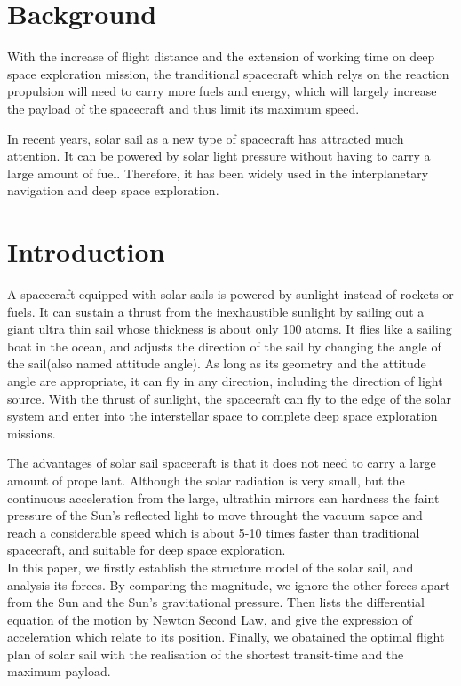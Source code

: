 \documentclass[../Paper.tex]{subfiles}
\begin{document}
\section{Background}

With the increase of flight distance and the extension of working time on deep space exploration mission, the tranditional spacecraft which relys on the reaction propulsion will need to carry more fuels and energy, which will largely increase the payload of the spacecraft and thus limit its maximum speed.            

In recent years, solar sail as a new type of spacecraft has attracted much attention. It can be powered by solar light pressure without having to carry a large amount of fuel. Therefore, it has been widely used in the interplanetary navigation and deep space exploration. 

\section{Introduction}	

A spacecraft equipped with solar sails is powered by sunlight instead of rockets or fuels. It can sustain a thrust from the inexhaustible sunlight by sailing out a giant ultra thin sail whose thickness is about only 100 atoms. It flies like a sailing boat in the ocean, and adjusts the direction of the sail by changing the angle of the sail(also named attitude angle). As long as its geometry and the attitude angle are appropriate, it can fly in any direction, including the direction of light source. With the thrust of sunlight, the spacecraft can fly to the edge of the solar system and enter into the interstellar space to complete deep space exploration missions. 

The advantages of solar sail spacecraft is that it does not need to carry a large amount of propellant. Although the solar radiation is very small, but the continuous acceleration from the large, ultrathin mirrors can hardness the faint pressure of the Sun's reflected light to move throught the vacuum sapce and reach a considerable speed which is about 5-10 times faster than traditional spacecraft, and suitable for deep space exploration.            
\\

In this paper, we firstly establish the structure model of the solar sail, and analysis its forces. By comparing the magnitude, we ignore the other forces apart from the Sun and the Sun's gravitational pressure. Then lists the differential equation of the motion by Newton Second Law, and give the expression of acceleration which relate to its position. Finally, we obatained the optimal flight plan of solar sail with the realisation of the shortest transit-time and the maximum payload. 
\end{document}

